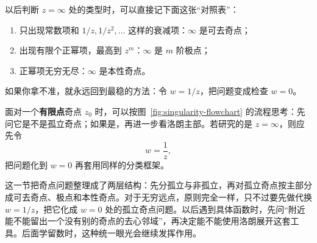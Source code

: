 \begin{tishi}[一个非常实用的速判]
以后判断 $z=\infty$ 处的类型时，可以直接记下面这张``对照表''：
\begin{enumerate}
    \item 只出现常数项和 $1/z,1/z^2,\ldots$ 这样的衰减项：$\infty$ 是可去奇点；
    \item 出现有限个正幂项，最高到 $z^m$：$\infty$ 是 $m$ 阶极点；
    \item 正幂项无穷无尽：$\infty$ 是本性奇点。
\end{enumerate}

如果你拿不准，就永远回到最稳的方法：令 $w=1/z$，把问题变成检查 $w=0$。
\end{tishi}

\begin{tishi}[奇点怎么快速判断]
面对一个\textbf{有限点}奇点 $z_0$ 时，可以按图~\ref{fig:singularity-flowchart} 的流程思考：先问它是不是孤立奇点；如果是，再进一步看洛朗主部。若研究的是 $z=\infty$，则应先令
\[
    w=\frac{1}{z},
\]
把问题化到 $w=0$ 再套用同样的分类框架。
\end{tishi}

\begin{tishi}[本节小结]
这一节把奇点问题整理成了两层结构：先分孤立与非孤立，再对孤立奇点按主部分成可去奇点、极点和本性奇点。对于无穷远点，原则完全一样，只不过要先做代换 $w=1/z$，把它化成 $w=0$ 处的孤立奇点问题。以后遇到具体函数时，先问``附近能不能留出一个没有别的奇点的去心邻域''，再决定能不能使用洛朗展开这套工具。后面学留数时，这种统一眼光会继续发挥作用。
\end{tishi}


